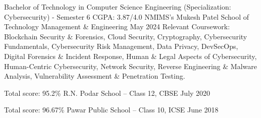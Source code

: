 \begin{cventries}
	
	\cventry
	{Bachelor of Technology in Computer Science Engineering (Specialization: Cybersecurity) - Semester 6 CGPA: 3.87/4.0} %
        {NMIMS's Mukesh Patel School of Technology Management \& Engineering}
	{May 2024} %
        {} %
	{Relevant Coursework: Blockchain Security \& Forensics, Cloud Security, Cryptography, Cybersecurity Fundamentals, Cybersecurity Risk Management, Data Privacy, DevSecOps, Digital Forensics \& Incident Response, Human \& Legal Aspects of Cybersecurity, Human-Centric Cybersecurity, Network Security, Reverse Engineering \& Malware Analysis, Vulnerability Assessment \& Penetration Testing.\newline} %
	\vspace{-3.5mm} 
	
	
 \cventry
	{Total score: 95.2\%} %
	{R.N. Podar School – Class 12, CBSE} %
	{July 2020} %
     {} %
	{
	}%
	\vspace{-3.5mm} 
	
	\cventry
	{Total score: 96.67\%} %
	{Pawar Public School – Class 10, ICSE} %
	{June 2018} %
     {} %
	{
	}%
	\vspace{-3.5mm} 
\end{cventries}
